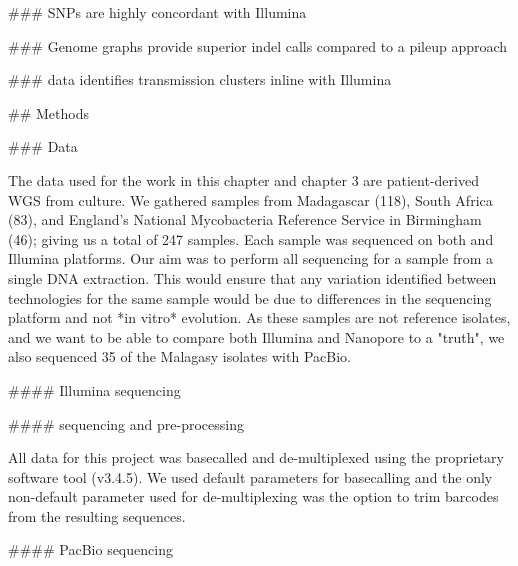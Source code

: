 \begin{markdown}
### \ont{} SNPs are highly concordant with Illumina


### Genome graphs provide superior \ont{} indel calls compared to a pileup approach


### \ont{} data identifies transmission clusters inline with Illumina


## Methods


### Data

The data used for the work in this chapter and chapter 3 are patient-derived \mtb{} WGS from culture. We gathered samples from Madagascar (118), South Africa (83), and England's National Mycobacteria Reference Service in Birmingham (46); giving us a total of 247 samples.  
Each sample was sequenced on both \ont{} and Illumina platforms. Our aim was to perform all sequencing for a sample from a single DNA extraction. This would ensure that any variation identified between technologies for the same sample would be due to differences in the sequencing platform and not *in vitro* evolution.  
As these samples are not reference isolates, and we want to be able to compare both Illumina and Nanopore to a "truth", we also sequenced 35 of the Malagasy isolates with PacBio.

#### Illumina sequencing


#### \ont{} sequencing and pre-processing


All \ont{} data for this project was basecalled and de-multiplexed using the \ont{} proprietary software tool \guppy{} (v3.4.5). We used default parameters for basecalling and the only non-default parameter used for de-multiplexing was the option to trim barcodes from the resulting sequences.  

#### PacBio sequencing


\end{markdown}
